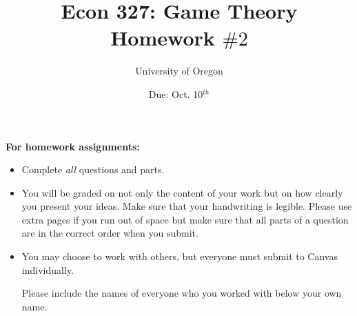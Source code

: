 \documentclass[addpoints]{exam}
\title{
    \textbf{Econ 327: Game Theory} \\ 
    Homework $\#2$
    }
\author{University of Oregon}
\date{Due: Oct. 10$^{th}$}
\begin{document}
\maketitle

\begin{center}
  \gradetable[h][questions]
\end{center}

\vspace{0.5in}

\begin{center}
  \textbf{For homework assignments:}
\end{center}

\begin{itemize}


  \item Complete \textit{all} questions and parts.


  \item You will be graded on not only the content of your work
    but on how clearly you present your ideas.
    Make sure that your handwriting is legible.
    Please use extra pages if you run out of space 
    but make sure that all parts of a question 
    are in the correct order when you submit.

  \item You may choose to work with others,
  but everyone must submit to Canvas individually.

  Please include the names of everyone who you worked with 
  below your own name.
 
\end{itemize}

\vspace{1.0in}


\vspace{0.5in}

\end{document}
